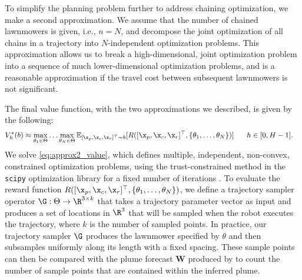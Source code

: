 To simplify the planning problem further to address chaining optimization, we make a second approximation. We assume that the number of chained lawnmowers is given, i.e., $n=N$, and decompose the joint optimization of all chains in a trajectory into $N$-independent optimization problems. This approximation allows us to break a high-dimensional, joint optimization problem into a sequence of much lower-dimensional optimization problems, and is a reasonable approximation if the travel cost between subsequent lawnmowers is not significant. 

The final \PHORTEX value function, with the two approximations we described, is given by the following:
\begin{align}
     V_h^{*}(b) &\approx  \max_{\theta_1 \in \Theta} \dots \max_{\theta_N\in \Theta} \mathbb{E}_{[\x_{p}, \x_{c}, \x_{r}]^\top \sim b}[R([\x_{p}, \x_{c}, \x_{r}]^\top, \{\theta_1, \dots, \theta_N\})] \hspace{0.6cm} h \in [0, H-1].
    \label{eq:approx2_value}
\end{align}
We solve \cref{eq:approx2_value}, which defines multiple, independent, non-convex, constrained optimization problems, using the trust-constrained method in the \texttt{scipy} optimization library for a fixed number of iterations \autocite{conn2000trust}. To evaluate the reward function $R([\x_{p}, \x_{c}, \x_{r}]^\top, \{\theta_1, \dots, \theta_N\})$, we define a trajectory sampler operator $\G: \Theta \to \R^{3 \times k}$ that takes a trajectory parameter vector as input and produces a set of locations in $\R^3$ that will be sampled when the robot executes the trajectory, where $k$ is the number of sampled points. In practice, our trajectory sampler $\G$ produces the lawnmower specified by $\theta$ and then subsamples uniformly along its length with a fixed spacing. These sample points can then be compared with the plume forecast $\mathbf{W}$ produced by \PHUMES to count the number of sample points that are contained within the inferred plume.


